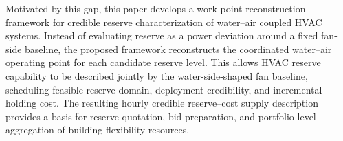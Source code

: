 \documentclass[journal]{IEEEtran}
\theoremstyle{remark}
\begin{document}

Motivated by this gap, this paper develops a work-point reconstruction framework for credible reserve characterization of water--air coupled HVAC systems. Instead of evaluating reserve as a power deviation around a fixed fan-side baseline, the proposed framework reconstructs the coordinated water--air operating point for each candidate reserve level. This allows HVAC reserve capability to be described jointly by the water-side-shaped fan baseline, scheduling-feasible reserve domain, deployment credibility, and incremental holding cost. The resulting hourly credible reserve--cost supply description provides a basis for reserve quotation, bid preparation, and portfolio-level aggregation of building flexibility resources.
\end{document}
